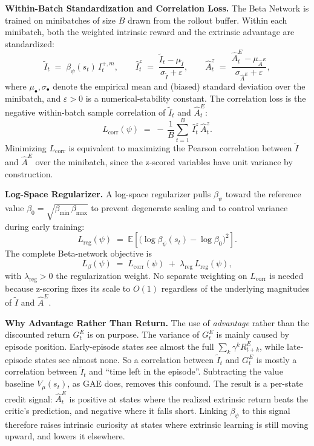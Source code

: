 \textbf{Within-Batch Standardization and Correlation Loss.} The Beta Network is trained on minibatches of size $B$ drawn from the rollout buffer. Within each minibatch, both the weighted intrinsic reward and the extrinsic advantage are standardized:
\begin{equation}
\tilde I_t \;=\; \beta_\psi(s_t)\, I_t^{+,m},
\qquad
\hat I_t^{z} \;=\; \frac{\tilde I_t - \mu_{\tilde I}}{\sigma_{\tilde I} + \varepsilon},
\qquad
\hat A_t^{z} \;=\; \frac{\hat A_t^{E} - \mu_{\hat A^E}}{\sigma_{\hat A^E} + \varepsilon},
\label{eq:zscored_signals}
\end{equation}
where $\mu_\bullet, \sigma_\bullet$ denote the empirical mean and (biased) standard deviation over the minibatch, and $\varepsilon > 0$ is a numerical-stability constant. The correlation loss is the negative within-batch sample correlation of $\tilde I_t$ and $\hat A_t^{E}$:
\begin{equation}
L_\text{corr}(\psi)
\;=\;
-\,\frac{1}{B}\sum_{t=1}^{B}\, \hat I_t^{z}\,\hat A_t^{z}.
\label{eq:corr_loss}
\end{equation}
Minimizing $L_\text{corr}$ is equivalent to maximizing the Pearson correlation between $\tilde I$ and $\hat A^{E}$ over the minibatch, since the z-scored variables have unit variance by construction.

\textbf{Log-Space Regularizer.} A log-space regularizer pulls $\beta_\psi$ toward the reference value $\beta_0 = \sqrt{\beta_\text{min}\,\beta_\text{max}}$ to prevent degenerate scaling and to control variance during early training:
\begin{equation}
L_\text{reg}(\psi) \;=\; \mathbb{E}\!\left[ \bigl( \log \beta_\psi(s_t) - \log \beta_0 \bigr)^2 \right].
\label{eq:reg_loss}
\end{equation}
The complete Beta-network objective is
\begin{equation}
L_\beta(\psi) \;=\; L_\text{corr}(\psi) \;+\; \lambda_\text{reg}\, L_\text{reg}(\psi),
\label{eq:beta_loss}
\end{equation}
with $\lambda_\text{reg} > 0$ the regularization weight. No separate weighting on $L_\text{corr}$ is needed because z-scoring fixes its scale to $O(1)$ regardless of the underlying magnitudes of $\tilde I$ and $\hat A^{E}$.

\textbf{Why Advantage Rather Than Return.} The use of \emph{advantage} rather than the discounted return $G_t^{E}$ \cite{andres2025impact} is on purpose. The variance of $G_t^{E}$ is mainly caused by episode position. Early-episode states see almost the full $\sum_{k} \gamma^{k} R_{t+k}^{E}$, while late-episode states see almost none. So a correlation between $\tilde I_t$ and $G_t^{E}$ is mostly a correlation between $\tilde I_t$ and ``time left in the episode''. Subtracting the value baseline $V_\mu(s_t)$, as GAE does, removes this confound. The result is a per-state credit signal: $\hat A_t^{E}$ is positive at states where the realized extrinsic return beats the critic's prediction, and negative where it falls short. Linking $\beta_\psi$ to this signal therefore raises intrinsic curiosity at states where extrinsic learning is still moving upward, and lowers it elsewhere.

